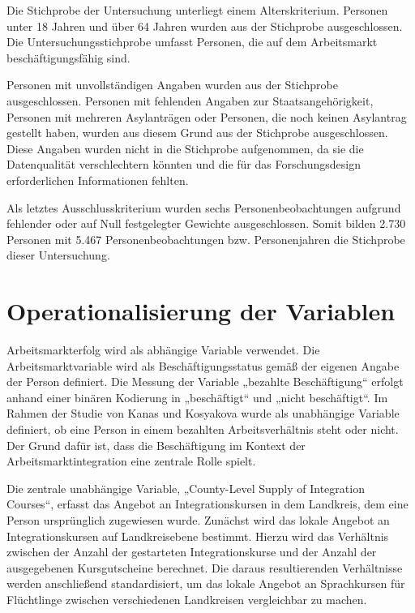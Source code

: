 Die Stichprobe der Untersuchung unterliegt einem Alterskriterium. Personen unter 18 Jahren und über 64 Jahren wurden aus der Stichprobe ausgeschlossen. Die Untersuchungsstichprobe umfasst Personen, die auf dem Arbeitsmarkt beschäftigungsfähig sind.

Personen mit unvollständigen Angaben wurden aus der Stichprobe ausgeschlossen. Personen mit fehlenden Angaben zur Staatsangehörigkeit, Personen mit mehreren Asylanträgen oder Personen, die noch keinen Asylantrag gestellt haben, wurden aus diesem Grund aus der Stichprobe ausgeschlossen. Diese Angaben wurden nicht in die Stichprobe aufgenommen, da sie die Datenqualität verschlechtern könnten und die für das Forschungsdesign erforderlichen Informationen fehlten.

Als letztes Ausschlusskriterium wurden sechs Personenbeobachtungen aufgrund fehlender oder auf Null festgelegter Gewichte ausgeschlossen. Somit bilden 2.730 Personen mit 5.467 Personenbeobachtungen bzw. Personenjahren die Stichprobe dieser Untersuchung.

\section{Operationalisierung der Variablen}
\label{cha:operationalisierung}

Arbeitsmarkterfolg wird als abhängige Variable verwendet. Die Arbeitsmarktvariable wird als Beschäftigungsstatus gemäß der eigenen Angabe der Person definiert. Die Messung der Variable „bezahlte Beschäftigung“ erfolgt anhand einer binären Kodierung in „beschäftigt“ und „nicht beschäftigt“. Im Rahmen der Studie von Kanas und Kosyakova wurde als unabhängige Variable definiert, ob eine Person in einem bezahlten Arbeitsverhältnis steht oder nicht. Der Grund dafür ist, dass die Beschäftigung im Kontext der Arbeitsmarktintegration eine zentrale Rolle spielt.

Die zentrale unabhängige Variable, „County-Level Supply of Integration Courses“, erfasst das Angebot an Integrationskursen in dem Landkreis, dem eine Person ursprünglich zugewiesen wurde. Zunächst wird das lokale Angebot an Integrationskursen auf Landkreisebene bestimmt. Hierzu wird das Verhältnis zwischen der Anzahl der gestarteten Integrationskurse und der Anzahl der ausgegebenen Kursgutscheine berechnet. Die daraus resultierenden Verhältnisse werden anschließend standardisiert, um das lokale Angebot an Sprachkursen für Flüchtlinge zwischen verschiedenen Landkreisen vergleichbar zu machen.

